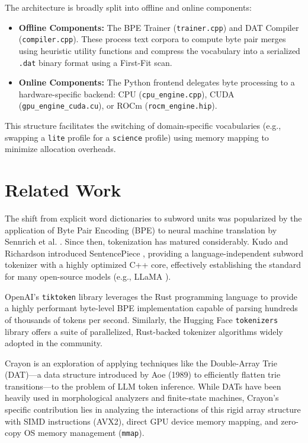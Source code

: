 \documentclass[11pt,a4paper,twocolumn]{article}
\begin{document}
The architecture is broadly split into offline and online components:
\begin{itemize}
    \item \textbf{Offline Components:} The BPE Trainer (\texttt{trainer.cpp}) and DAT Compiler (\texttt{compiler.cpp}). These process text corpora to compute byte pair merges using heuristic utility functions and compress the vocabulary into a serialized \texttt{.dat} binary format using a First-Fit scan.
    \item \textbf{Online Components:} The Python frontend delegates byte processing to a hardware-specific backend: CPU (\texttt{cpu\_engine.cpp}), CUDA (\texttt{gpu\_engine\_cuda.cu}), or ROCm (\texttt{rocm\_engine.hip}).
\end{itemize}

This structure facilitates the switching of domain-specific vocabularies (e.g., swapping a \texttt{lite} profile for a \texttt{science} profile) using memory mapping to minimize allocation overheads.

\section{Related Work}
\label{sec:related_work}

The shift from explicit word dictionaries to subword units was popularized by the application of Byte Pair Encoding (BPE) to neural machine translation by Sennrich et al. \cite{sennrich2016}. Since then, tokenization has matured considerably. Kudo and Richardson introduced SentencePiece \cite{kudo2018}, providing a language-independent subword tokenizer with a highly optimized C++ core, effectively establishing the standard for many open-source models (e.g., LLaMA \cite{touvron2023}).

OpenAI's \texttt{tiktoken} library \cite{radford2019} leverages the Rust programming language to provide a highly performant byte-level BPE implementation capable of parsing hundreds of thousands of tokens per second. Similarly, the Hugging Face \texttt{tokenizers} library \cite{wolf2020} offers a suite of parallelized, Rust-backed tokenizer algorithms widely adopted in the community.

Crayon is an exploration of applying techniques like the Double-Array Trie (DAT)---a data structure introduced by Aoe (1989) \cite{aoe1989} to efficiently flatten trie transitions---to the problem of LLM token inference. While DATs have been heavily used in morphological analyzers and finite-state machines, Crayon's specific contribution lies in analyzing the interactions of this rigid array structure with SIMD instructions (AVX2), direct GPU device memory mapping, and zero-copy OS memory management (\texttt{mmap}).
\end{document}
